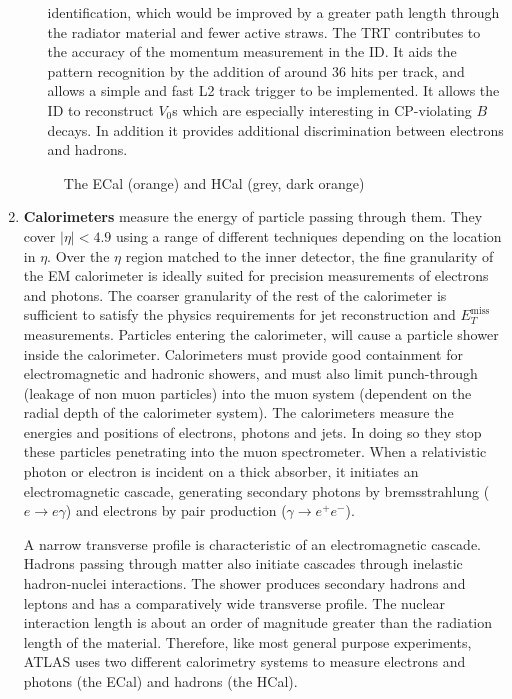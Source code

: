 \begin{enumerate}
\begin{enumerate}
        identification, which would be improved by a greater path length through the radiator material and fewer active straws. The TRT contributes to the accuracy of the momentum measurement in the ID. It aids the pattern recognition by the addition of around 36 hits per track, and allows a simple and fast L2 track trigger to be implemented. It allows the ID to reconstruct $V_0$s which are especially interesting in CP-violating $B$ decays. In addition it provides additional discrimination between electrons and hadrons.
    \end{enumerate}
    \begin{figure}[ht]
        \centering
        \caption{The ECal (orange) and HCal (grey, dark orange)}
        \label{fig:ATLAS-cals}
    \end{figure}
    \item \textbf{Calorimeters} measure the energy of particle passing through them. They cover $|\eta| < 4.9$ using a range of different techniques depending on the location in $\eta$. Over the $\eta$ region matched to the inner detector, the fine granularity of the EM calorimeter is ideally suited for precision measurements of electrons and photons. The coarser granularity of the rest of the calorimeter is sufficient to satisfy the physics requirements for jet reconstruction and $E_T^{\textrm{miss}}$ measurements. Particles entering the calorimeter, will cause a particle shower inside the calorimeter. Calorimeters must provide good containment for electromagnetic and hadronic showers, and must also limit punch-through (leakage of non muon particles) into the muon system (dependent on the radial depth of the calorimeter system). The calorimeters measure the energies and positions of electrons, photons and jets. In doing so they stop these particles penetrating into the muon spectrometer. When a relativistic photon or electron is incident on a thick absorber, it initiates an electromagnetic cascade, generating secondary photons by bremsstrahlung ($e \rightarrow e\gamma$) and electrons by pair production ($\gamma \rightarrow e^+ e^- $).
    
    A narrow transverse profile is characteristic of an electromagnetic cascade. Hadrons passing through matter also initiate cascades through inelastic hadron-nuclei interactions. The shower produces secondary hadrons and leptons and has a comparatively wide transverse profile. The nuclear interaction length is about an order of magnitude greater than the radiation length of the material. Therefore, like most general purpose experiments, ATLAS uses two different calorimetry systems to measure electrons and photons (the ECal) and hadrons (the HCal). 


\end{enumerate}
